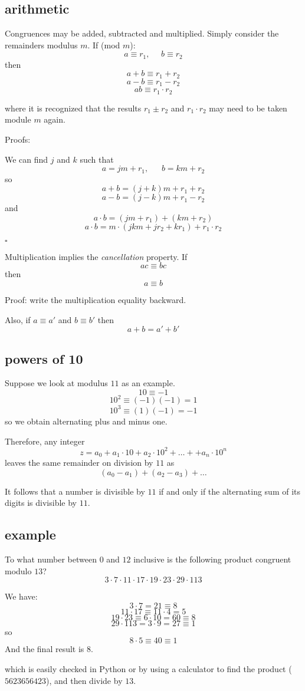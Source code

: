 \documentclass[11pt, oneside]{article}
\begin{document}
\subsection*{arithmetic}

Congruences may be added, subtracted and multiplied.  Simply consider the remainders modulus $m$.  If (mod $m$):
\[ a \equiv r_1, \ \ \ \ \ \ b \equiv r_2 \]
then
\[  a + b \equiv r_1 + r_2 \]
\[  a - b \equiv r_1 - r_2 \]
\[  ab \equiv r_1 \cdot r_2 \]

where it is recognized that the results $r_1 \pm r_2$ and $r_1 \cdot r_2$ may need to be taken module $m$ again.

Proofs:

We can find $j$ and $k$ such that
\[ a = jm + r_1, \ \ \ \ \ \ \ b = km + r_2 \]
so
\[ a + b = (j + k)m + r_1 + r_2 \]
\[ a - b = (j - k)m + r_1 - r_2 \]
and
\[ a \cdot b = (jm + r_1) + (km + r_2) \]
\[ a \cdot b = m \cdot (jkm + jr_2 + kr_1) + r_1 \cdot r_2 \]

$\square$

Multiplication implies the \emph{cancellation} property.  If 
\[ ac \equiv bc \]
then
\[ a \equiv b \]

Proof:  write the multiplication equality backward.

Also, if $a \equiv a'$ and $b \equiv b'$ then
\[ a + b = a' + b' \]

\subsection*{powers of 10}
Suppose we look at modulus $11$ as an example.
\[ 10 \equiv -1 \]
\[ 10^2 \equiv (-1)(-1) = 1 \]
\[ 10^3 \equiv (1)(-1) = -1 \]
so we obtain alternating plus and minus one.

Therefore, any integer
\[ z = a_0 + a_1 \cdot 10 + a_2 \cdot 10^2 + \dots + + a_n \cdot 10^n \]
leaves the same remainder on division by $11$ as
\[ (a_0 - a_1) + (a_2 - a_3) + \dots \]

It follows that a number is divisible by $11$ if and only if the alternating sum of its digits is divisible by $11$.

\subsection*{example}

To what number between $0$ and $12$ inclusive is the following product congruent modulo $13$?
\[ 3 \cdot 7 \cdot 11\cdot 17 \cdot 19 \cdot 23 \cdot 29 \cdot 113 \]

We have:
\[ 3 \cdot 7 = 21 \equiv 8 \]
\[ 11 \cdot 17 \equiv 11 \cdot 4 = 5 \]
\[ 19 \cdot 23 \equiv 6 \cdot 10 = 60 \equiv 8 \]
\[ 29 \cdot 113 = 3 \cdot 9 = 27 \equiv 1 \]
so
\[ 8 \cdot 5 \equiv 40 \equiv 1 \]
And the final result is $8$.

which is easily checked in Python or by using a calculator to find the product ($5623656423$), and then divide by $13$.
\end{document}
